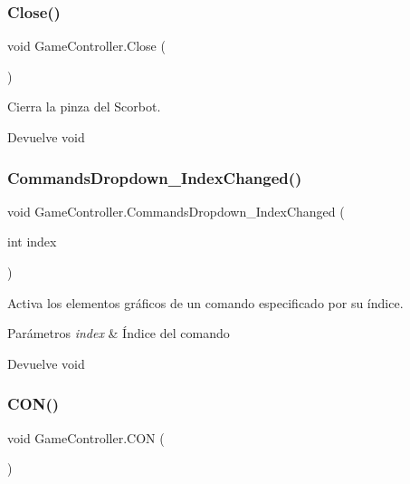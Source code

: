 \subsubsection{\texorpdfstring{Close()}{Close()}}
{\footnotesize\ttfamily void Game\+Controller.\+Close (\begin{DoxyParamCaption}{ }\end{DoxyParamCaption})\hspace{0.3cm}{\ttfamily [inline]}}

Cierra la pinza del Scorbot. \begin{DoxyReturn}{Devuelve}
void 
\end{DoxyReturn}
\mbox{\label{class_game_controller_a2ea8f0a42452c5dd938feed2713f87c7}} 
\subsubsection{\texorpdfstring{CommandsDropdown\_IndexChanged()}{CommandsDropdown\_IndexChanged()}}
{\footnotesize\ttfamily void Game\+Controller.\+Commands\+Dropdown\+\_\+\+Index\+Changed (\begin{DoxyParamCaption}\item[{int}]{index }\end{DoxyParamCaption})\hspace{0.3cm}{\ttfamily [inline]}}

Activa los elementos gráficos de un comando especificado por su índice. 
\begin{DoxyParams}{Parámetros}
{\em index} & Índice del comando \\
\hline
\end{DoxyParams}
\begin{DoxyReturn}{Devuelve}
void 
\end{DoxyReturn}
\mbox{\label{class_game_controller_ae9fc70a12ad70871780529854ea12d9c}} 
\subsubsection{\texorpdfstring{CON()}{CON()}}
{\footnotesize\ttfamily void Game\+Controller.\+C\+ON (\begin{DoxyParamCaption}{ }\end{DoxyParamCaption})\hspace{0.3cm}{\ttfamily [inline]}}

